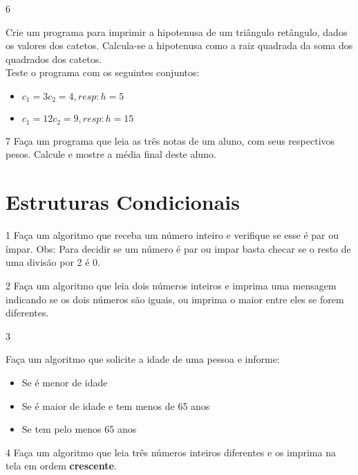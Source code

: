 \begin{exercicio}
  {6}
  {Crie um programa para imprimir a hipotenusa de um triângulo retângulo, dados os valores dos catetos. Calcula-se a hipotenusa como a raiz quadrada da soma dos quadrados dos catetos. \\
  Teste o programa com os seguintes conjuntos: \\
  \begin{itemize}
    \item $c_{1} = 3 c_{2} = 4, resp: h = 5$
    \item $c_{1} = 12c _{2} = 9, resp: h = 15$
  \end{itemize}}
\end{exercicio}

\begin{exercicio}
  {7}
  {Faça um programa que leia as três notas de um aluno, com seus respectivos pesos. Calcule e mostre a média final deste aluno.}
\end{exercicio}

\section{Estruturas Condicionais}

\begin{exercicio}
  {1}
  {Faça um algoritmo que receba um número inteiro e verifique se esse é par ou ímpar.}
  Obs: Para decidir se um número é par ou impar basta checar se o resto de uma divisão por 2 é 0.
\end{exercicio}

\begin{exercicio}
  {2}
  {Faça um algoritmo que leia dois números inteiros e imprima uma mensagem indicando se os dois números são iguais, ou imprima o maior entre eles se forem diferentes.}
\end{exercicio}

\begin{exercicio}
  {3}
  {Faça um algoritmo que solicite a idade de uma pessoa e informe:
  \begin{itemize}
    \item Se é menor de idade
    \item Se é maior de idade e tem menos de 65 anos
    \item Se tem pelo menos 65 anos
  \end{itemize}}
\end{exercicio}

\begin{exercicio}
  {4}
  Faça um algoritmo que leia três números inteiros diferentes e os imprima na tela em ordem \textbf{crescente}.
\end{exercicio}

